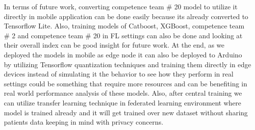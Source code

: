 In terms of future work, converting competence team \# 20 model to utilize it directly in mobile application can be done easily because its already converted to Tensorflow Lite. Also, training models of Catboost, XGBoost, competence team \# 2 and competence team \# 20 in FL settings can also be done and looking at their overall index can be good insight for future work. At the end, as we deployed the models in mobile as edge node it can also be deployed to Arduino by utilizing Tensorflow quantization techniques and training them directly in edge devices instead of simulating it the behavior to see how they perform in real settings could be something that require more resources and can be benefiting in real world performance analysis of these models. Also, after central training we can utilize transfer learning technique in federated learning environment where model is trained already and it will get trained over new dataset without sharing patients data keeping in mind with privacy concerns.  

